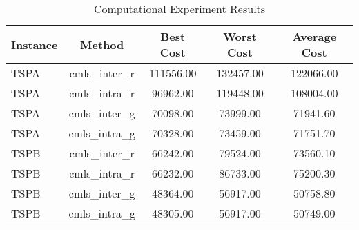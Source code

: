 \begin{table}[ht]
\centering
\caption{Computational Experiment Results}
\label{tab:results}
\begin{tabular}{lcccc}
\hline
Instance & Method & Best Cost & Worst Cost & Average Cost \\
\hline
TSPA & cmls_inter_r & 111556.00 & 132457.00 & 122066.00 \\
TSPA & cmls_intra_r & 96962.00 & 119448.00 & 108004.00  \\
TSPA & cmls_inter_g & 70098.00 & 73999.00 & 71941.60    \\
TSPA & cmls_intra_g & 70328.00 & 73459.00 & 71751.70    \\
TSPB & cmls_inter_r & 66242.00 & 79524.00 & 73560.10    \\
TSPB & cmls_intra_r & 66232.00 & 86733.00 & 75200.30    \\
TSPB & cmls_inter_g & 48364.00 & 56917.00 & 50758.80    \\
TSPB & cmls_intra_g & 48305.00 & 56917.00 & 50749.00    \\
\hline
\end{tabular}
\end{table}

